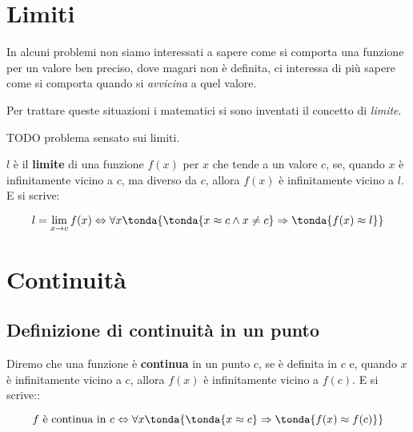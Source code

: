 \begin{center}
\begin{inaccessibleblock}[TODO.]
  \telescopio
  
  \iperinteri
\end{inaccessibleblock}
\end{center}

\section{Limiti}
\label{sec:cont_limiti}

In alcuni problemi non siamo interessati a sapere come si comporta una funzione 
per un valore ben preciso, dove magari non è definita, ci interessa di più 
sapere come si comporta quando si \emph{avvicina} a quel valore.

Per trattare queste situazioni i matematici si sono inventati il concetto di 
\emph{limite}.

TODO problema sensato sui limiti.

\begin{definizione}
\(l\) è il \textbf{limite} di una funzione \(f(x)\) per \(x\) 
che tende a un 
valore \(c\), se, quando \(x\) è infinitamente vicino a \(c\), 
ma diverso da \(c\), 
allora \(f(x)\) è infinitamente vicino a \(l\). E si scrive:

\[l=\lim_{x \rightarrow c} f(x) \Leftrightarrow 
\forall x \tonda{\tonda{x \approx c \wedge x \neq c} \Rightarrow 
\tonda{f(x) \approx l}}\]

\end{definizione}


\section{Continuità}
\label{sec:cont_continuita}

\subsection{Definizione di continuità in un punto}
\label{subsec:cont_definizione}


\begin{definizione}
Diremo che una funzione è \textbf{continua} in un punto \(c\), 
se è definita in \(c\) e, 
quando \(x\) è infinitamente vicino a \(c\), 
allora \(f(x)\) è infinitamente vicino a \(f(c)\). E si scrive::

\[f \text{ è continua in } c \Leftrightarrow 
\forall x \tonda{\tonda{x \approx c} \Rightarrow 
\tonda{f(x) \approx f(c)}}\]

\end{definizione}

